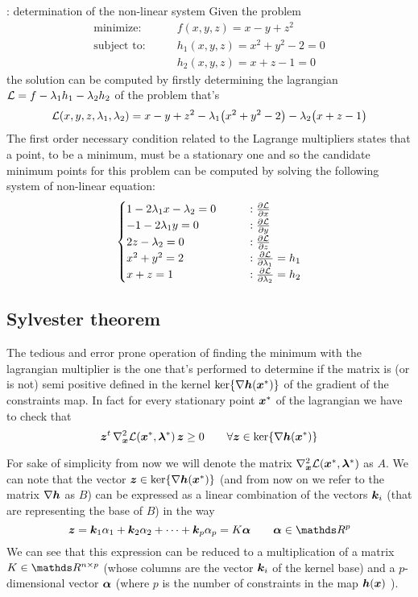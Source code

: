 	\begin{example}{: determination of the non-linear system} \label{es:min:esame1}
		Given the problem
		\begin{align*}
			\textrm{minimize:} \qquad & f(x,y,z) = x - y + z^2 \\
			\textrm{subject to:} \qquad & h_1(x,y,z) = x^2 + y^2 - 2 = 0 \\
			& h_2(x,y,z) = x+z-1 = 0
		\end{align*}
		the solution can be computed by firstly determining the lagrangian $\mathcal L = f - \lambda_1 h_1 - \lambda_2 h_2$ of the problem that's
		\[ \mathcal L(x,y,z, \lambda_1, \lambda_2) = x-y+z^2 - \lambda_1\big(x^2+y^2-2\big) - \lambda_2\big(x+z-1\big) \]
		The first order necessary condition related to the Lagrange multipliers states that a point, to be a minimum, must be a stationary one and so the candidate minimum points for this problem can be computed by solving the following system of non-linear equation:
		\[ \begin{cases}
			1 - 2\lambda_1 x - \lambda_2 = 0  \qquad & : \frac{\partial \mathcal L}{\partial x} \\
			-1 - 2\lambda_1 y = 0 & :\frac{\partial \mathcal L}{\partial y} \\
			2z - \lambda_2 = 0 & : \frac{\partial \mathcal L}{\partial z}\\
			x^2 + y^2 = 2 & : \frac{\partial \mathcal L}{\partial \lambda_1} =h_1 \\
			x + z = 1 & :\frac{\partial \mathcal L}{\partial \lambda_2} = h_2 
		\end{cases} \] 
		
	\end{example}

	
	\subsection{Sylvester theorem}
		The tedious and error prone operation of finding the minimum with the lagrangian multiplier is the one that's performed to determine if the matrix is (or is not) semi positive defined in the kernel $\ker\{\nabla \boldsymbol{h}(\boldsymbol{x}^*)\}$ of the gradient of the constraints map. In fact for every stationary point $\boldsymbol{x}^*$ of the lagrangian we have to check that
		\[ \boldsymbol{z}^t \, \nabla_{\boldsymbol{x}}^2 \mathcal L(\boldsymbol{x}^*,\boldsymbol{\lambda}^*) \, \boldsymbol{z} \geq 0 \qquad \forall \boldsymbol{z}\in \ker\{\nabla \boldsymbol{h}(\boldsymbol{x}^*)\} \]
		
		For sake of simplicity from now we will denote the matrix $\nabla_{\boldsymbol{x}}^2\mathcal L(\boldsymbol{x}^*,\boldsymbol{\lambda}^*)$ as $A$. We can note that the vector $\boldsymbol{z} \in \ker\{\nabla \boldsymbol{h}(\boldsymbol{x}^*)\}$ (and from now on we refer to the matrix $\nabla \boldsymbol{h}$ as $B$) can be expressed as a linear combination of the vectors $\boldsymbol{k}_i$ (that are representing the base of $B$) in the way
		\[ \vett z = \vett k_1 \alpha_1 + \vett k_2 \alpha_2 + \dots + \vett k_p \alpha_p = K \vett \alpha \qquad \vett \alpha \in \R^p \]
		We can see that this expression can be reduced to a multiplication of a matrix $K \in \R^{n\times p}$ (whose columns are the vector $\boldsymbol{k}_i$ of the kernel base) and a $p$-dimensional vector $\boldsymbol{\alpha}$ (where $p$ is the number of constraints in the map $\boldsymbol{h}(\boldsymbol{x})$ ).
		
